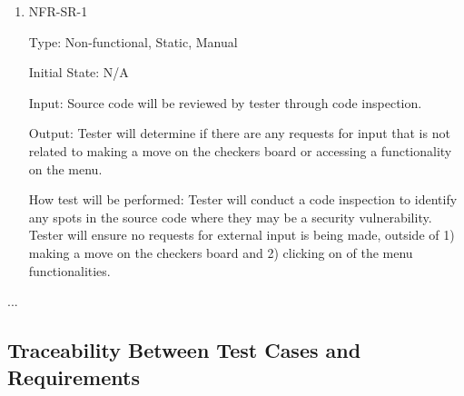 \documentclass[12pt, titlepage]{article}
\begin{document}
\begin{enumerate}

\item{NFR-SR-1\\}

Type: Non-functional, Static, Manual
					
Initial State: N/A
					
Input: Source code will be reviewed by tester through code inspection.
					
Output: Tester will determine if there are any requests for input that is not related to making a move on the checkers board or accessing a functionality on the menu.
					
How test will be performed: Tester will conduct a code inspection to identify any spots in the source code where they may be a security vulnerability. Tester will ensure no requests for external input is being made, outside of 1) making a move on the checkers board and 2) clicking on of the menu functionalities.

\end{enumerate}

...

\subsection{Traceability Between Test Cases and Requirements}
\end{document}
